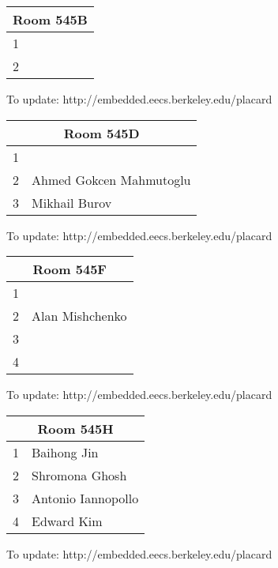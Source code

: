 \documentclass{article}
\begin{document}
\Huge
\bfseries

\noindent
\begin{tabular}{|l|l|}
\hline
\multicolumn{2}{|c|}{Room 545B} \\ \hline\hline
1& \\
2& \\

\hline
\end{tabular}

{\scriptsize To update: http://embedded.eecs.berkeley.edu/placard}
\vspace{1in}

\noindent
\begin{tabular}{|l|l|}
\hline
\multicolumn{2}{|c|}{Room 545D} \\ \hline\hline
1& \\
2&Ahmed Gokcen Mahmutoglu\\
3&Mikhail Burov\\

\hline
\end{tabular}

{\scriptsize To update: http://embedded.eecs.berkeley.edu/placard}
\vspace{1in}

\noindent
\begin{tabular}{|l|l|}
\hline
\multicolumn{2}{|c|}{Room 545F} \\ \hline\hline
1& \\
2&Alan Mishchenko\\
3& \\
4& \\

\hline
\end{tabular}

{\scriptsize To update: http://embedded.eecs.berkeley.edu/placard}
\vspace{1in}

\noindent
\begin{tabular}{|l|l|}
\hline
\multicolumn{2}{|c|}{Room 545H} \\ \hline\hline
1&Baihong  Jin\\
2&Shromona Ghosh\\
3&Antonio Iannopollo\\
4&Edward Kim\\

\hline
\end{tabular}

{\scriptsize To update: http://embedded.eecs.berkeley.edu/placard}
\vspace{1in}
\end{document}
